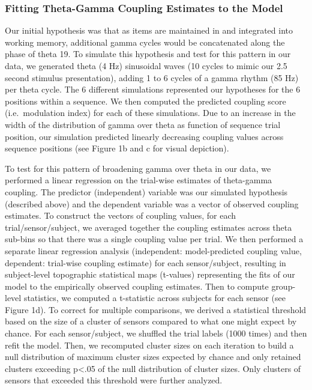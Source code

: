 \subsubsection{Fitting Theta-Gamma Coupling Estimates to the
Model}\label{fitting-theta-gamma-coupling-estimates-to-the-model}

Our initial hypothesis was that as items are maintained in and
integrated into working memory, additional gamma cycles would be
concatenated along the phase of theta 19. To simulate this hypothesis
and test for this pattern in our data, we generated theta (4 Hz)
sinusoidal waves (10 cycles to mimic our 2.5 second stimulus
presentation), adding 1 to 6 cycles of a gamma rhythm (85 Hz) per theta
cycle. The 6 different simulations represented our hypotheses for the 6
positions within a sequence. We then computed the predicted coupling
score (i.e.~modulation index) for each of these simulations. Due to an
increase in the width of the distribution of gamma over theta as
function of sequence trial position, our simulation predicted linearly
decreasing coupling values across sequence positions (see Figure 1b and
c for visual depiction).

To test for this pattern of broadening gamma over theta in our data, we
performed a linear regression on the trial-wise estimates of theta-gamma
coupling. The predictor (independent) variable was our simulated
hypothesis (described above) and the dependent variable was a vector of
observed coupling estimates. To construct the vectors of coupling
values, for each trial/sensor/subject, we averaged together the coupling
estimates across theta sub-bins so that there was a single coupling
value per trial. We then performed a separate linear regression analysis
(independent: model-predicted coupling value, dependent: trial-wise
coupling estimate) for each sensor/subject, resulting in subject-level
topographic statistical maps (t-values) representing the fits of our
model to the empirically observed coupling estimates. Then to compute
group-level statistics, we computed a t-statistic across subjects for
each sensor (see Figure 1d). To correct for multiple comparisons, we
derived a statistical threshold based on the size of a cluster of
sensors compared to what one might expect by chance. For each
sensor/subject, we shuffled the trial labels (1000 times) and then refit
the model. Then, we recomputed cluster sizes on each iteration to build
a null distribution of maximum cluster sizes expected by chance and only
retained clusters exceeding p\textless{}.05 of the null distribution of
cluster sizes. Only clusters of sensors that exceeded this threshold
were further analyzed.

